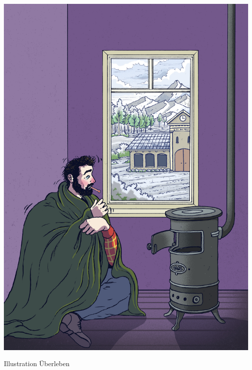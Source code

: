 \documentclass[justified,nobib,symmetric,twoside]{tufte-handout}
\begin{document}
\begin{marginfigure}[-6.3cm]
   \includegraphics[width=\linewidth]{figure_11.jpg}
   \caption{Illustration Überleben}
   \label{fig:abbildung_11}
\end{marginfigure}
\end{document}
